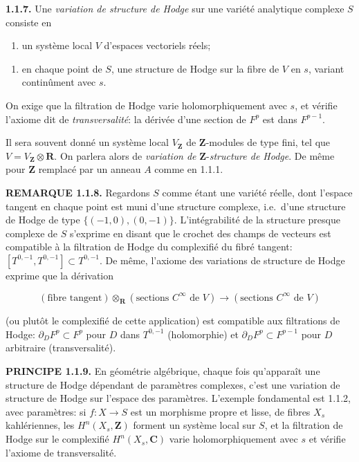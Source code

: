 \documentclass[10pt,a4paper]{article}
\providecommand{\tightlist}{\setlength{\itemsep}{0pt}\setlength{\parskip}{0pt}}
\newcommand{\SourcePage}[2]{\clearpage\setcounter{page}{#2}\typeout{D031_SOURCE_PAGE physical=#1 printed=#2}}
\begin{document}
\textbf{1.1.7.} Une \emph{variation de structure de Hodge} sur une variété analytique complexe \(S\) consiste en

\begin{enumerate}
\def\labelenumi{(\alph{enumi})}
\tightlist
\item
  un système local \(V\) d'espaces vectoriels réels;
\end{enumerate}

\SourcePage{7}{253}
\begin{enumerate}
\def\labelenumi{(\alph{enumi})}
\setcounter{enumi}{1}
\tightlist
\item
  en chaque point de \(S\), une structure de Hodge sur la fibre de \(V\) en \(s\), variant continûment avec \(s\).
\end{enumerate}

On exige que la filtration de Hodge varie holomorphiquement avec \(s\), et vérifie l'axiome dit de \emph{transversalité}: la dérivée d'une section de \(F^p\) est dans \(F^{p-1}\).

Il sera souvent donné un système local \(V_{\mathbf Z}\) de \(\mathbf Z\)-modules de type fini, tel que \(V=V_{\mathbf Z}\otimes\mathbf R\). On parlera alors de \emph{variation de} \(\mathbf Z\)-\emph{structure de Hodge}. De même pour \(\mathbf Z\) remplacé par un anneau \(A\) comme en 1.1.1.

\textbf{REMARQUE 1.1.8.} Regardons \(S\) comme étant une variété réelle, dont l'espace tangent en chaque point est muni d'une structure complexe, i.e.~d'une structure de Hodge de type \(\{(-1,0),(0,-1)\}\). L'intégrabilité de la structure presque complexe de \(S\) s'exprime en disant que le crochet des champs de vecteurs est compatible à la filtration de Hodge du complexifié du fibré tangent: \([T^{0,-1},T^{0,-1}]\subset T^{0,-1}\). De même, l'axiome des variations de structure de Hodge exprime que la dérivation

\[
(\text{fibre tangent})\otimes_{\mathbf R}(\text{sections }C^\infty\text{ de }V)
\longrightarrow
(\text{sections }C^\infty\text{ de }V)
\]

(ou plutôt le complexifié de cette application) est compatible aux filtrations de Hodge: \(\partial_DF^p\subset F^p\) pour \(D\) dans \(T^{0,-1}\) (holomorphie) et \(\partial_DF^p\subset F^{p-1}\) pour \(D\) arbitraire (transversalité).

\textbf{PRINCIPE 1.1.9.} En géométrie algébrique, chaque fois qu'apparaît une structure de Hodge dépendant de paramètres complexes, c'est une variation de structure de Hodge sur l'espace des paramètres. L'exemple fondamental est 1.1.2, avec paramètres: si \(f:X\to S\) est un morphisme propre et lisse, de fibres \(X_s\) kahlériennes, les \(H^n(X_s,\mathbf Z)\) forment un système local sur \(S\), et la filtration de Hodge sur le complexifié \(H^n(X_s,\mathbf C)\) varie holomorphiquement avec \(s\) et vérifie l'axiome de transversalité.
\end{document}
